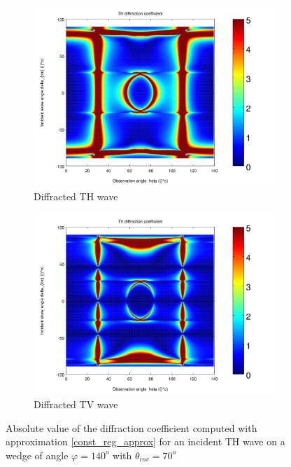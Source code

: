 \begin{figure}
\centering
\begin{subfigure}[b]{0.45\textwidth}
        \includegraphics[width=\textwidth]{images/chapter4/const_reg/XpropTH_140_70_TH.png}
        \caption{Diffracted TH wave}
        \label{const_reg:DTH}
    \end{subfigure}
   \begin{subfigure}[b]{0.45\textwidth}
        \includegraphics[width=\textwidth]{images/chapter4/const_reg/XpropTV_140_70_TH.png}
        \caption{Diffracted TV wave}
        \label{const_reg:DTV}
    \end{subfigure} 
\caption{Absolute value of the diffraction coefficient computed with approximation \eqref{const_reg_approx} for an incident TH wave on a wedge of angle $\varphi=140^o$ with $\theta_{inc}=70^o$}
\label{const_reg:D}
\end{figure}


